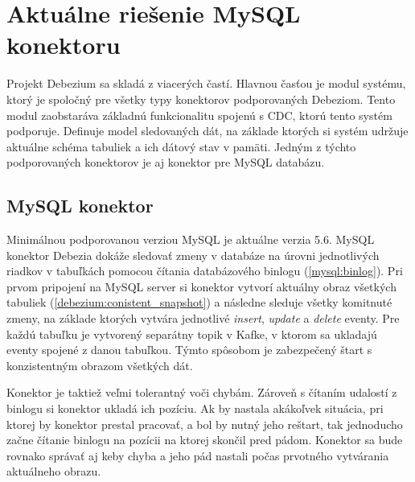 \chapter{Aktuálne riešenie MySQL konektoru}
Projekt Debezium sa skladá z viacerých častí. Hlavnou časťou je modul systému, ktorý je spoločný pre všetky typy konektorov podporovaných Debeziom. Tento modul zaobstaráva základnú funkcionalitu spojenú s CDC, ktorú tento systém podporuje. Definuje model sledovaných dát, na základe ktorých si systém udržuje aktuálne schéma tabuliek a ich dátový stav v pamäti. Jedným z týchto podporovaných konektorov je aj konektor pre MySQL databázu.

\section{MySQL konektor}\label{debezium:mysql_connector}
Minimálnou podporovanou verziou MySQL je aktuálne verzia 5.6. MySQL konektor Debezia dokáže sledovať zmeny v databáze na úrovni jednotlivých riadkov v tabuľkách pomocou čítania databázového binlogu (\ref{mysql:binlog}). Pri prvom pripojení na MySQL server si konektor vytvorí aktuálny obraz všetkých tabuliek (\ref{debezium:conistent_snapshot}) a následne sleduje všetky komitnuté zmeny, na základe ktorých vytvára jednotlivé \textit{insert}, \textit{update} a \textit{delete} eventy. Pre každú tabuľku je vytvorený separátny topik v Kafke, v ktorom sa ukladajú eventy spojené z danou tabuľkou. Týmto spôsobom je zabezpečený štart s konzistentným obrazom všetkých dát.

Konektor je taktiež veľmi tolerantný voči chybám. Zároveň s čítaním udalostí z binlogu si konektor ukladá ich pozíciu. Ak by nastala akákoľvek situácia, pri ktorej by konektor prestal pracovať, a bol by nutný jeho reštart, tak jednoducho začne čítanie binlogu na pozícii na ktorej skončil pred pádom. Konektor sa bude rovnako správať aj keby chyba a jeho pád nastali počas prvotného vytvárania aktuálneho obrazu.

